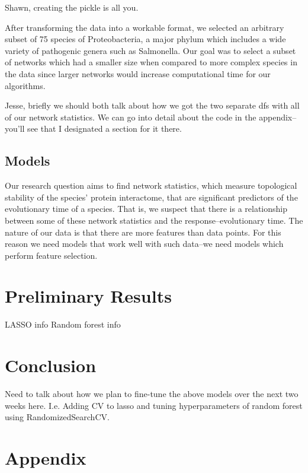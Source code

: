 \documentclass[12pt]{article}
\begin{document}
Shawn, creating the pickle is all you.

After transforming the data into a workable format, we selected an arbitrary subset of 75 species of Proteobacteria, a major phylum which includes a wide variety of pathogenic genera such as Salmonella. Our goal was to select a subset of networks which had a smaller size when compared to more complex species in the data since larger networks would increase computational time for our algorithms. 

Jesse, briefly we should both talk about how we got the two separate dfs with all of our network statistics. We can go into detail about the code in the appendix--you’ll see that I designated a section for it there. 


\subsection{Models}
Our research question aims to find network statistics, which measure topological stability of the species’ protein interactome, that are significant predictors of the evolutionary time of a species. That is, we suspect that there is a relationship between some of these network statistics and the response--evolutionary time. The nature of our data is that there are more features than data points. For this reason we need models that work well with such data--we need models which perform feature selection. 


\section{Preliminary Results}
LASSO info
Random forest info
\section{Conclusion}
Need to talk about how we plan to fine-tune the above models over the next two weeks here. I.e. Adding CV to lasso and tuning hyperparameters of random forest using RandomizedSearchCV.
\section{Appendix}
\end{document}
